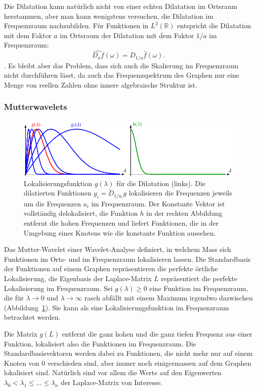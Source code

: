 Die Dilatation kann natürlich nicht von einer echten
Dilatation im Ortsraum herstammen, aber man kann wenigstens versuchen, die
Dilatation im Frequenzraum nachzubilden.
Für Funktionen in $L^2(\mathbb{R})$ entspricht die Dilatation mit dem
Faktor $a$ im Ortsraum der Dilatation mit dem Faktor $1/a$ im Frequenzraum:
\[
\widehat{D_af}(\omega) = D_{1/a}\hat{f}(\omega).
\]
\cite[Satz~3.14]{buch:mathsem-wavelets}.
Es bleibt aber das Problem, dass sich auch die Skalierung im Frequenzraum
nicht durchführen lässt, da auch das Frequenzspektrum des Graphen nur eine
Menge von reellen Zahlen ohne innere algebraische Struktur ist.

\subsubsection{Mutterwavelets}
\begin{figure}
\centering
\includegraphics{chapters/70-graphen/images/gh.pdf}
\caption{Lokalisierungsfunktion $g(\lambda)$ für die Dilatation (links).
Die dilatierten Funktionen $g_i=\tilde{D}_{1/a_i}g$ lokalisieren
die Frequenzen jeweils um die Frequenzen $a_i$ im Frequenzraum.
Der Konstante Vektor ist vollständig delokalisiert, die Funktion $h$
in der rechten Abbildung entfernt die hohen Frequenzen und liefert Funktionen,
die in der Umgebung eines Knotens wie die konstante Funktion aussehen.
\label{buch:graphs:fig:lokalisierung}}
\end{figure}
Das Mutter-Wavelet einer Wavelet-Analyse definiert, in welchem Mass
sich Funktionen im Orts- und im Frequenzraum lokalisieren lassen.
Die Standardbasis der Funktionen auf einem Graphen repräsentieren die
perfekte örtliche Lokalisierung, die Eigenbasis der Laplace-Matrix
$L$ repräsentiert die perfekte Lokalisierung im Frequenzraum.
Sei $g(\lambda)\ge 0$ eine Funktion im Frequenzraum, die für  $\lambda\to0$ und
$\lambda\to\infty$ rasch abfällt mit einem Maximum irgendwo dazwischen
(Abbildung~\ref{buch:graphs:fig:lokalisierung}).
Sie kann als eine Lokalisierungsfunktion im Frequenzraum betrachtet werden.

Die Matrix $g(L)$ entfernt die ganz hohen und die ganz tiefen Frequenz
aus einer Funktion, lokalisiert also die Funktionen im Frequenzraum.
Die Standardbasisvektoren werden dabei zu Funktionen, die nicht mehr nur
auf einem Knoten von $0$ verschieden sind, aber immer noch einigermassen
auf dem Graphen lokalisiert sind.
Natürlich sind vor allem die Werte auf den Eigenwerten
$\lambda_0 < \lambda_1\le \dots\le \lambda_n$ der Laplace-Matrix
von Interesse.


